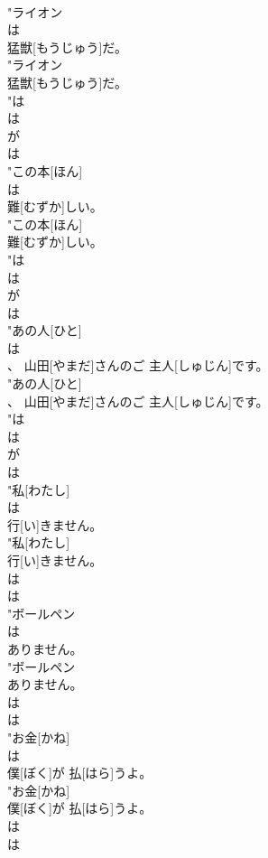 \documentclass[8pt]{extreport}
\begin{document}
\begin{CJK}{UTF8}{min}
\\	"ライオン
\\	は
\\	猛獣[もうじゅう]だ。
\\	"ライオン
\\	猛獣[もうじゅう]だ。
\\	"は 
\\	は 
\\	が 
\\	は
\\	"この本[ほん]
\\	は
\\	難[むずか]しい。
\\	"この本[ほん]
\\	難[むずか]しい。
\\	"は 
\\	は 
\\	が 
\\	は
\\	"あの人[ひと]
\\	は
\\	、 山田[やまだ]さんのご 主人[しゅじん]です。
\\	"あの人[ひと]
\\	、 山田[やまだ]さんのご 主人[しゅじん]です。
\\	"は 
\\	は 
\\	が 
\\	は
\\	"私[わたし]
\\	は
\\	行[い]きません。
\\	"私[わたし]
\\	行[い]きません。
\\	は 
\\	は
\\	"ボールペン
\\	は
\\	ありません。
\\	"ボールペン
\\	ありません。
\\	は 
\\	は
\\	"お金[かね]
\\	は
\\	僕[ぼく]が 払[はら]うよ。
\\	"お金[かね]
\\	僕[ぼく]が 払[はら]うよ。
\\	は 
\\	は 

\end{CJK}
\end{document}
